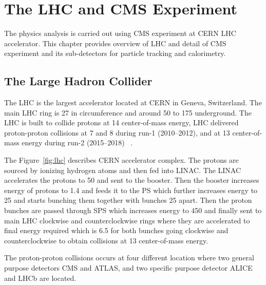 \chapter{
  The LHC and CMS Experiment
 }\label{ch_cms}

The physics analysis is carried out using \gls{CMS} experiment at
\gls{CERN} \gls{LHC} accelerator. This chapter provides overview of \gls{LHC}
and detail of CMS experiment and its sub-detectors for particle tracking
and calorimetry.

\section{
  The Large Hadron Collider
 }\label{ch_cms:lhc}

The \gls{LHC} is the largest accelerator located at
\gls{CERN} in Geneva, Switzerland.
The main \gls{LHC} ring is 27\km{} in circumference
and around 50 to 175\m{} underground.
The \gls{LHC} is built to collide protons at 14\TeV{} center-of-mass energy,
LHC delivered proton-proton collisions at 7 and 8\TeV{}
during run-1 (2010--2012), and at 13\TeV{} center-of-mass energy during
run-2 (2015--2018) ~\cite{Evans:2008}.

The Figure~\ref{fig:lhc} describes \gls{CERN} accelerator complex.
The protons are sourced by ionizing hydrogen atoms
and then fed into \gls{LINAC}.
The \gls{LINAC} accelerates the protons to 50\MeV{} and sent to the booster.
Then the booster increases energy of protons to 1.4\GeV{} and
feeds it to the \gls{PS} which further increases energy to 25\GeV{}
and starts bunching them together with bunches 25\nanoseconds{} apart.
Then the proton bunches are passed through \gls{SPS} which increases energy
to 450\GeV{} and finally sent to main \gls{LHC} clockwise and counterclockwise
rings where they are accelerated to final energy required which is 6.5\TeV{}
for both bunches going clockwise and counterclockwise
to obtain collisions at 13\TeV{} center-of-mass energy.

The proton-proton collisions occurs at four different location where two
general purpose detectors \gls{CMS} and \gls{ATLAS}, and
two specific purpose detector \gls{ALICE} and \gls{LHCb} are located.

